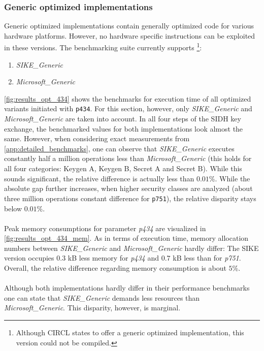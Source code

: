 \subsubsection{Generic optimized implementations}\label{sec:analysis_generic}
Generic optimized implementations contain generally optimized code for various hardware platforms. However, no hardware specific instructions can be exploited in these versions. The benchmarking suite currently supports \footnote{Although \gls{CIRCL} states to offer a generic optimized implementation\parencite{circl2020github}, this version could not be compiled.}:
\begin{enumerate}
\item \textit{SIKE\_Generic}
\item \textit{Microsoft\_Generic}
\end{enumerate}
\autoref{fig:results_opt_434} shows the benchmarks for execution time of all optimized variants initiated with \texttt{p434}. For this section, however, only \textit{SIKE\_Generic} and \textit{Microsoft\_Generic} are taken into account. In all four steps of the \gls{SIDH} key exchange, the benchmarked values for both implementations look almost the same. However, when considering exact measurements from  \ref{app:detailed_benchmarks}, one can observe that \textit{SIKE\_Generic} executes constantly half a million operations less than \textit{Microsoft\_Generic} (this holds for all four categories: Keygen A, Keygen B, Secret A and Secret B). While this sounds significant, the relative difference is actually less than $0.01$\%. While the absolute gap further increases, when higher security classes are analyzed (about three million operations constant difference for \texttt{p751}), the relative disparity stays below $0.01$\%.
\\\\
Peak memory consumptions for parameter \textit{p434} are visualized in  \autoref{fig:results_opt_434_mem}. As in terms of execution time, memory allocation numbers between \textit{SIKE\_Generic} and \textit{Microsoft\_Generic} hardly differ: The \gls{SIKE} version occupies $0.3$ \gls{kB} less memory for \textit{p434} and $0.7$ \gls{kB} less than for \textit{p751}. Overall, the relative difference regarding memory consumption is about $5$\%.
\\\\
Although both implementations hardly differ in their performance benchmarks one can state that \textit{SIKE\_Generic} demands less resources than \textit{Microsoft\_Generic}. This disparity, however, is marginal.

